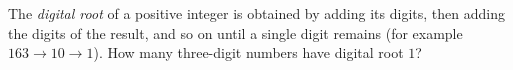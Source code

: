 The \emph{digital root} of a positive integer is obtained by adding its digits, then adding the digits of the result, and so on until a single digit remains (for example $163\to10\to1$). How many three-digit numbers have digital root $1$?
